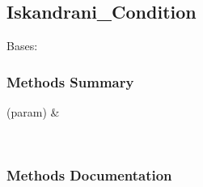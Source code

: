 \documentclass[letterpaper,10pt,english]{sphinxmanual}
\begin{document}
\sphinxstepscope


\subsection{Iskandrani\_Condition}
\label{\detokenize{api/MARIGOLD.Iskandrani_Condition:iskandrani-condition}}\label{\detokenize{api/MARIGOLD.Iskandrani_Condition::doc}}

\begin{fulllineitems}
\label{\detokenize{api/MARIGOLD.Iskandrani_Condition:MARIGOLD.Iskandrani_Condition}}
\pysigstartsignatures
{}
\pysigstopsignatures
\sphinxAtStartPar
Bases: 
\subsubsection*{Methods Summary}


\begin{savenotes}\sphinxattablestart
\sphinxthistablewithglobalstyle
\sphinxthistablewithnovlinesstyle
\centering
\begin{tabulary}{\linewidth}[t]{}
\sphinxtoprule
\sphinxtableatstartofbodyhook
\sphinxAtStartPar
{}(param)
&
\sphinxAtStartPar

\\
\sphinxbottomrule
\end{tabulary}
\sphinxtableafterendhook\par
\sphinxattableend\end{savenotes}
\subsubsection*{Methods Documentation}

\begin{fulllineitems}
\label{\detokenize{api/MARIGOLD.Iskandrani_Condition:MARIGOLD.Iskandrani_Condition.area_avg}}
\pysigstartsignatures
{}
\pysigstopsignatures
\end{fulllineitems}


\end{fulllineitems}
\end{document}
